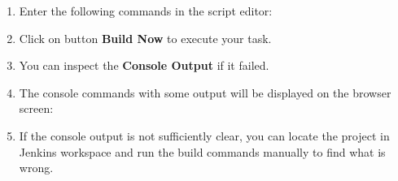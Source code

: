 \documentclass[11pt,a4paper]{article}
\begin{document}
\begin{enumerate}
\item Enter the following commands in the script editor:\\
\item Click on button {\bf Build Now} to execute your task.
\item You can inspect the {\bf Console Output} if it failed.\\
\item The console commands with some output will be displayed on the browser screen:\\
\item If the console output is not sufficiently clear, you can locate the project in Jenkins 
workspace and run the build commands manually to find what is wrong.\\
\end{enumerate}
\end{document}
